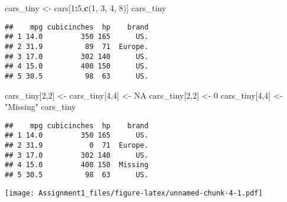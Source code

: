 \documentclass[
]{article}
\newenvironment{Shaded}{\begin{snugshade}}{\end{snugshade}}
\newcommand{\ConstantTok}[1]{\textcolor[rgb]{0.56,0.35,0.01}{#1}}
\newcommand{\DecValTok}[1]{\textcolor[rgb]{0.00,0.00,0.81}{#1}}
\newcommand{\FunctionTok}[1]{\textcolor[rgb]{0.13,0.29,0.53}{\textbf{#1}}}
\newcommand{\NormalTok}[1]{#1}
\newcommand{\OtherTok}[1]{\textcolor[rgb]{0.56,0.35,0.01}{#1}}
\newcommand{\SpecialCharTok}[1]{\textcolor[rgb]{0.81,0.36,0.00}{\textbf{#1}}}
\newcommand{\StringTok}[1]{\textcolor[rgb]{0.31,0.60,0.02}{#1}}
\begin{document}
\begin{Shaded}
\begin{Highlighting}[]
\NormalTok{cars\_tiny }\OtherTok{\textless{}{-}}\NormalTok{ cars[}\DecValTok{1}\SpecialCharTok{:}\DecValTok{5}\NormalTok{,}\FunctionTok{c}\NormalTok{(}\DecValTok{1}\NormalTok{, }\DecValTok{3}\NormalTok{, }\DecValTok{4}\NormalTok{, }\DecValTok{8}\NormalTok{)]}
\NormalTok{cars\_tiny}
\end{Highlighting}
\end{Shaded}

\begin{verbatim}
##    mpg cubicinches  hp    brand
## 1 14.0         350 165      US.
## 2 31.9          89  71  Europe.
## 3 17.0         302 140      US.
## 4 15.0         400 150      US.
## 5 30.5          98  63      US.
\end{verbatim}

\begin{Shaded}
\begin{Highlighting}[]
\NormalTok{cars\_tiny[}\DecValTok{2}\NormalTok{,}\DecValTok{2}\NormalTok{] }\OtherTok{\textless{}{-}}\NormalTok{ cars\_tiny[}\DecValTok{4}\NormalTok{,}\DecValTok{4}\NormalTok{] }\OtherTok{\textless{}{-}} \ConstantTok{NA}
\NormalTok{cars\_tiny[}\DecValTok{2}\NormalTok{,}\DecValTok{2}\NormalTok{] }\OtherTok{\textless{}{-}} \DecValTok{0}
\NormalTok{cars\_tiny[}\DecValTok{4}\NormalTok{,}\DecValTok{4}\NormalTok{] }\OtherTok{\textless{}{-}} \StringTok{"Missing"}
\NormalTok{cars\_tiny}
\end{Highlighting}
\end{Shaded}

\begin{verbatim}
##    mpg cubicinches  hp    brand
## 1 14.0         350 165      US.
## 2 31.9           0  71  Europe.
## 3 17.0         302 140      US.
## 4 15.0         400 150  Missing
## 5 30.5          98  63      US.
\end{verbatim}

\begin{Shaded}
\end{Shaded}

\texttt{[image: Assignment1\_files/figure-latex/unnamed-chunk-4-1.pdf]}

\begin{Shaded}
\end{Shaded}
\end{document}
